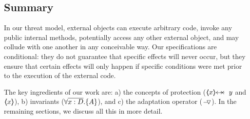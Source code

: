 \subsection*{Summary}

In our threat model, external objects can execute arbitrary code, invoke any public internal methods,  potentially access any other external object, and may collude with one another in any conceivable way.
Our specifications are conditional: they do not guarantee that specific effects will never occur, but they ensure that certain effects will only happen if specific conditions were met prior to the execution of the external code.
 
The key ingredients of our work are: a) the concepts of protection ($\protectedFrom {x} {y}$ and $\langle\!\!\langle x \rangle\!\!\rangle$), b) \scoped invariants (${\forall {\overline {x:D}}.{{\{}}{A}{{\}}}}$), and c) the adaptation operator ($ { } \!-\!\!\!\,\!{\triangledown} { } $).
In the remaining sections, we discuss all this in more detail.

 

 

 
 
